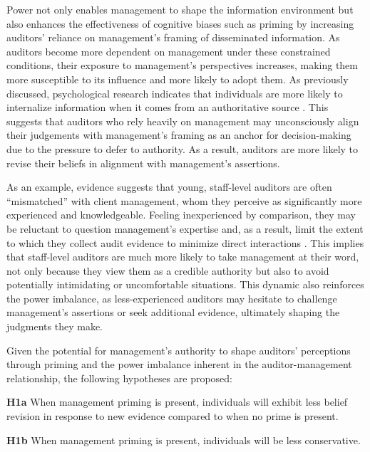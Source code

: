 \documentclass[12pt,english]{article}
\begin{document}
Power not only enables management to shape the information environment but also enhances the effectiveness of cognitive biases such as priming by increasing auditors’ reliance on management’s framing of disseminated information. As auditors become more dependent on management under these constrained conditions, their exposure to management’s perspectives increases, making them more susceptible to its influence and more likely to adopt them. As previously discussed, psychological research indicates that individuals are more likely to internalize information when it comes from an authoritative source \citep{lippitt1952, milgram1974}. This suggests that auditors who rely heavily on management may unconsciously align their judgements with management’s framing as an anchor for decision-making due to the pressure to defer to authority. As a result, auditors are more likely to revise their beliefs in alignment with management’s assertions.

As an example, evidence suggests that young, staff-level auditors are often “mismatched” with client management, whom they perceive as significantly more experienced and knowledgeable. Feeling inexperienced by comparison, they may be reluctant to question management’s expertise and, as a result, limit the extent to which they collect audit evidence to minimize direct interactions \citep{bennett2013}. This implies that staff-level auditors are much more likely to take management at their word, not only because they view them as a credible authority but also to avoid potentially intimidating or uncomfortable situations. This dynamic also reinforces the power imbalance, as less-experienced auditors may hesitate to challenge management’s assertions or seek additional evidence, ultimately shaping the judgments they make.

Given the potential for management’s authority to shape auditors’ perceptions through priming and the power imbalance inherent in the auditor-management relationship, the following hypotheses are proposed:

\begin{center}
    \textbf{H1a} When management priming is present, individuals will exhibit less belief revision in response to new evidence compared to when no prime is present.
\end{center}

\begin{center}
    \textbf{H1b} When management priming is present, individuals will be less conservative.
\end{center}
\end{document}
